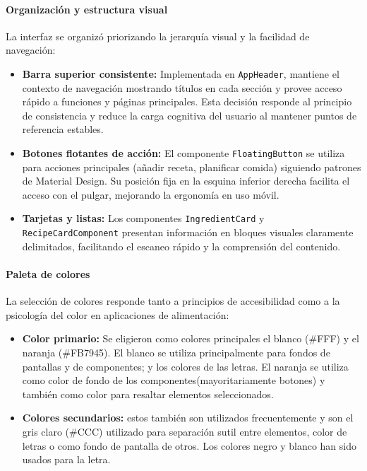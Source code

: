 \documentclass[twoside, openright, 11pt]{report}
\begin{document}
				\paragraph*{Organización y estructura visual}
					La interfaz se organizó priorizando la jerarquía visual y la facilidad de navegación:
					
					\begin{itemize}
						\item \textbf{Barra superior consistente:} Implementada en \texttt{AppHeader}, mantiene el contexto de navegación mostrando títulos en cada sección y provee acceso rápido a funciones y páginas principales. Esta decisión responde al principio de consistencia y reduce la carga cognitiva del usuario al mantener puntos de referencia estables.
						
						\item \textbf{Botones flotantes de acción:} El componente \texttt{FloatingButton} se utiliza para acciones principales (añadir receta, planificar comida) siguiendo patrones de Material Design. Su posición fija en la esquina inferior derecha facilita el acceso con el pulgar, mejorando la ergonomía en uso móvil.
						
						\item \textbf{Tarjetas y listas:} Los componentes \texttt{IngredientCard} y \texttt{RecipeCardComponent} presentan información en bloques visuales claramente delimitados, facilitando el escaneo rápido y la comprensión del contenido.
					\end{itemize}
				
				\paragraph*{Paleta de colores}
					La selección de colores responde tanto a principios de accesibilidad como a la psicología del color en aplicaciones de alimentación:
					
					\begin{itemize}
						\item \textbf{Color primario:} Se eligieron como colores principales el blanco (\#FFF) y el naranja (\#FB7945). El blanco se utiliza principalmente para fondos de pantallas y de componentes; y los colores de las letras. El naranja se utiliza como color de fondo de los componentes(mayoritariamente botones) y también como color para resaltar elementos seleccionados.
						
						\item \textbf{Colores secundarios:} estos también son utilizados frecuentemente y son el gris claro (\#CCC) utilizado para separación sutil entre elementos, color de letras o como fondo de pantalla de otros. Los colores negro y blanco han sido usados para la letra.
						
					\end{itemize}
					
\end{document}
